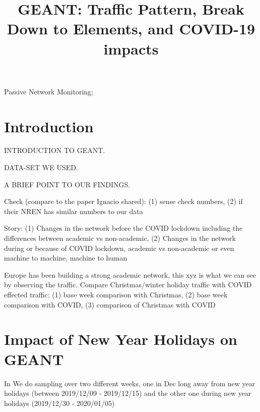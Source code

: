 \documentclass[10pt, journal, letterpaper]{IEEEtran}
\begin{document}
\title{GEANT: Traffic Pattern, Break Down to Elements, and COVID-19 impacts}
\author{}
\maketitle	
\begin{abstract}
\end{abstract}	
\begin{IEEEkeywords} 
    Passive Network Monitoring;
\end{IEEEkeywords}

\section{Introduction}
INTRODUCTION TO GEANT.

DATA-SET WE USED.

A BRIEF POINT TO OUR FINDINGS.

Check (compare to the paper Ignacio shared): (1) sense check numbers, (2) if their NREN has similar numbers to our data

Story: (1) Changes in the network before the COVID lockdown including the differences between academic vs non-academic, (2) Changes in the network during or because of COVID lockdown, academic vs non-academic or even machine to machine, machine to human

Europe has been building a strong academic network, this xyz is what we can see by observing the traffic. Compare Christmas/winter holiday traffic with COVID effected traffic: (1) base week comparison with Christmas, (2) base week comparison with COVID, (3) comparison of Christmas with COVID

\section{Impact of New Year Holidays on GEANT}
In We do sampling over two different weeks, one in Dec long away from new year holidays (between 2019/12/09 - 2019/12/15) and the other one during new year holidays (2019/12/30 - 2020/01/05)
\end{document}
